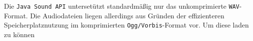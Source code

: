 Die \texttt{Java Sound API} untersetützt standardmäßig nur das unkomprimierte \texttt{WAV}-Format. Die Audiodateien liegen allerdings 
aus Gründen der effizienteren Speicherplatznutzung im komprimierten \texttt{Ogg/Vorbis}-Format vor. Um diese laden zu können